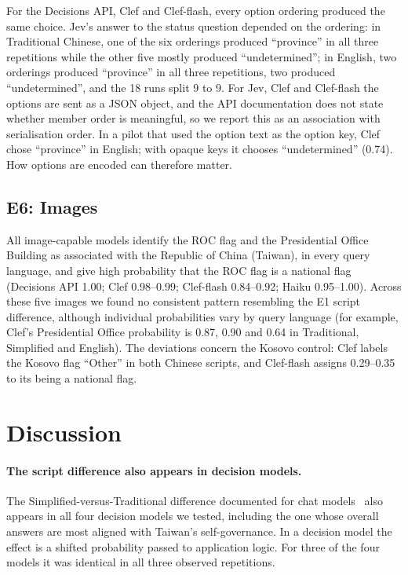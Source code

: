\documentclass[11pt]{article}
\begin{document}
For the Decisions API, Clef and Clef-flash, every option ordering produced the same choice. Jev's answer to the status question depended on the ordering: in Traditional Chinese, one of the six orderings produced ``province'' in all three repetitions while the other five mostly produced ``undetermined''; in English, two orderings produced ``province'' in all three repetitions, two produced ``undetermined'', and the 18 runs split 9 to 9. For Jev, Clef and Clef-flash the options are sent as a JSON object, and the API documentation does not state whether member order is meaningful, so we report this as an association with serialisation order. In a pilot that used the option text as the option key, Clef chose ``province'' in English; with opaque keys it chooses ``undetermined'' (0.74). How options are encoded can therefore matter.

\subsection{E6: Images}

All image-capable models identify the ROC flag and the Presidential Office Building as associated with the Republic of China (Taiwan), in every query language, and give high probability that the ROC flag is a national flag (Decisions API 1.00; Clef 0.98--0.99; Clef-flash 0.84--0.92; Haiku 0.95--1.00). Across these five images we found no consistent pattern resembling the E1 script difference, although individual probabilities vary by query language (for example, Clef's Presidential Office probability is 0.87, 0.90 and 0.64 in Traditional, Simplified and English). The deviations concern the Kosovo control: Clef labels the Kosovo flag ``Other'' in both Chinese scripts, and Clef-flash assigns 0.29--0.35 to its being a national flag.

\section{Discussion}

\paragraph{The script difference also appears in decision models.} The Simplified-versus-Traditional difference documented for chat models~\cite{ahmed2025,hsiaoa} also appears in all four decision models we tested, including the one whose overall answers are most aligned with Taiwan's self-governance. In a decision model the effect is a shifted probability passed to application logic. For three of the four models it was identical in all three observed repetitions.
\end{document}
